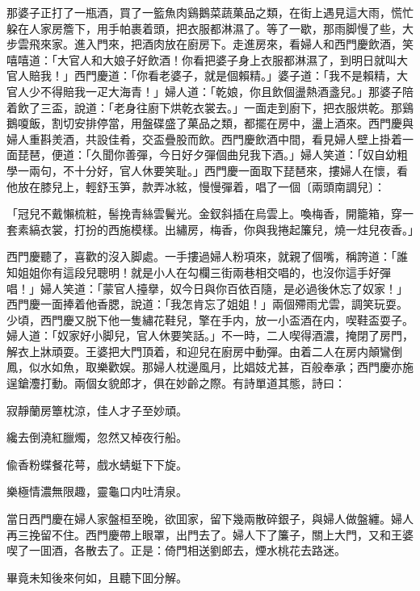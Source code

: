 那婆子正打了一瓶酒，買了一籃魚肉鷄鵝菜蔬菓品之類，在街上遇見這大雨，慌忙躱在人家房簷下，用手帕裹着頭，把衣服都淋濕了。等了一歇，那雨脚慢了些，大步雲飛來家。進入門來，把酒肉放在廚房下。走進房來，看婦人和西門慶飲酒，笑嘻嘻道：「大官人和大娘子好飲酒！你看把婆子身上衣服都淋濕了，到明日就叫大官人賠我！」西門慶道：「你看老婆子，就是個賴精。」婆子道：「我不是賴精，大官人少不得賠我一疋大海青！」婦人道：「乾娘，你且飲個盪熱酒盞兒。」那婆子陪着飲了三盃，說道：「老身往廚下烘乾衣裳去。」一面走到廚下，把衣服烘乾。那鷄鵝嗄飯，割切安排停當，用盤碟盛了菓品之類，都擺在房中，盪上酒來。西門慶與婦人重斟羙酒，共設佳肴，交盃疊股而飲。西門慶飲酒中間，看見婦人壁上掛着一面琵琶，便道：「久聞你善彈，今日好夕彈個曲兒我下酒。」婦人笑道：「奴自幼粗學一兩句，不十分好，官人休要笑耻。」西門慶一面取下琵琶來，摟婦人在懷，看他放在膝兒上，輕舒玉笋，款弄冰絃，慢慢彈着，唱了一個〔兩頭南調兒〕：
\begin{myquote}
「冠兒不戴懶梳粧，髻挽青絲雲鬢光。金釵斜插在烏雲上。喚梅香，開籠箱，穿一套素縞衣裳，打扮的西施模樣。出繡房，梅香，你與我捲起簾兒，燒一炷兒夜香。」
\end{myquote}

西門慶聽了，喜歡的沒入脚處。一手摟過婦人粉項來，就親了個嘴，稱誇道：「誰知姐姐你有這段兒聰明！就是小人在勾欄三街兩巷相交唱的，也沒你這手好彈唱！」婦人笑道：「蒙官人擡擧，奴今日與你百依百隨，是必過後休忘了奴家！」西門慶一面捧着他香腮，說道：「我怎肯忘了姐姐！」兩個殢雨尤雲，調笑玩耍。少頃，西門慶又脱下他一隻繡花鞋兒，擎在手内，放一小盃酒在内，喫鞋盃耍子。婦人道：「奴家好小脚兒，官人休要笑話。」不一時，二人喫得酒濃，掩閉了房門，解衣上牀頑耍。王婆把大門頂着，和迎兒在廚房中動彈。由着二人在房内顛鸞倒鳳，似水如魚，取樂歡娱。那婦人枕邊風月，比娼妓尤甚，百般奉承；西門慶亦施逞鎗灋打動。兩個女貌郎才，俱在妙齡之際。有詩單道其態，詩曰：
\begin{myquote}
寂靜蘭房簟枕涼，佳人才子至妙頑。

纔去倒澆紅臘燭，忽然又棹夜行船。

偸香粉蝶餐花萼，戲水蜻蜓下下旋。

樂極情濃無限趣，靈龜口内吐清泉。
\end{myquote}

當日西門慶在婦人家盤桓至晚，欲囬家，留下幾兩散碎銀子，與婦人做盤纏。婦人再三挽留不住。西門慶帶上眼罩，出門去了。婦人下了簾子，關上大門，又和王婆喫了一囬酒，各散去了。正是：倚門相送劉郎去，煙水桃花去路迷。

畢竟未知後來何如，且聽下囬分解。

